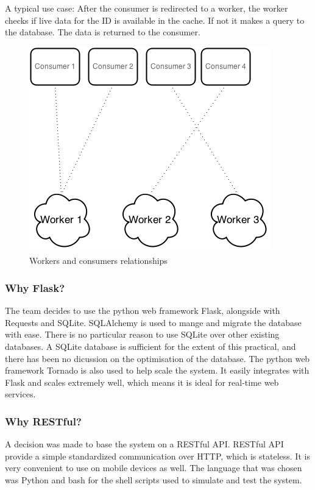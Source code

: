 \documentclass{sigchi}
\begin{document}
A typical use case:
After the consumer is redirected to a worker, the worker checks if live data for the ID is available in the cache. If not it makes a query to the database. The data is returned to the consumer.

\begin{figure}[!h]
\centering
\includegraphics[width=0.9\columnwidth]{img/cons_to_worker}
\caption{Workers and consumers relationships}
\label{fig:cons_to_worker}
\end{figure}

\subsubsection{Why Flask?}

The team decides to use the python web framework Flask, alongside with Requests and SQLite. SQLAlchemy is used to mange and migrate the database with ease. There is no particular reason to use SQLite over other existing databases. A SQLite database is sufficient for the extent of this practical, and there has been no dicussion on the optimisation of the database. The python web framework Tornado is also used to help scale the system. It easily integrates with Flask and scales extremely well, which means it is ideal for real-time web services.

\subsubsection{Why RESTful?}

A decision was made to base the system on a RESTful API. RESTful API provide a simple standardized communication over HTTP, which is stateless. It is very convenient to use on mobile devices as well. The language that was chosen was Python and bash for the shell scripts used to simulate and test the system. 
\end{document}
